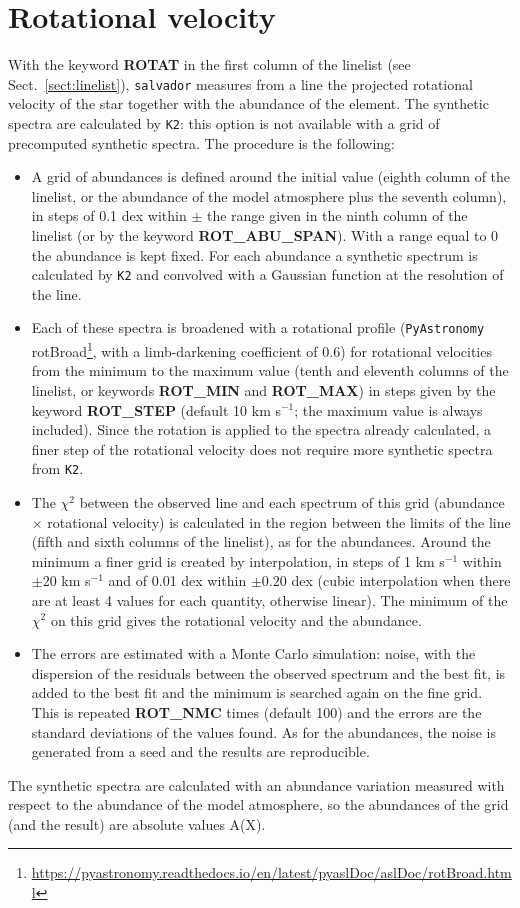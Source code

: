 \documentclass[modern]{aastex701}
\begin{document}
\section{Rotational velocity} \label{sect:rotation}
\hrulefill

With the keyword {\bf ROTAT} in the first column of the linelist (see Sect.~\ref{sect:linelist}), \texttt{salvador} measures from a line the projected rotational velocity of the star together with the abundance of the element. The synthetic spectra are calculated by \texttt{K2}: this option is not available with a grid of precomputed synthetic spectra. The procedure is the following:
\begin{itemize}
    \item A grid of abundances is defined around the initial value (eighth column of the linelist, or the abundance of the model atmosphere plus the seventh column), in steps of 0.1 dex within $\pm$ the range given in the ninth column of the linelist (or by the keyword {\bf ROT\_ABU\_SPAN}). With a range equal to 0 the abundance is kept fixed. For each abundance a synthetic spectrum is calculated by \texttt{K2} and convolved with a Gaussian function at the resolution of the line.
    \item Each of these spectra is broadened with a rotational profile (\texttt{PyAstronomy} rotBroad\footnote{\url{https://pyastronomy.readthedocs.io/en/latest/pyaslDoc/aslDoc/rotBroad.html}}, with a limb-darkening coefficient of 0.6) for rotational velocities from the minimum to the maximum value (tenth and eleventh columns of the linelist, or keywords {\bf ROT\_MIN} and {\bf ROT\_MAX}) in steps given by the keyword {\bf ROT\_STEP} (default 10 km s$^{-1}$; the maximum value is always included). Since the rotation is applied to the spectra already calculated, a finer step of the rotational velocity does not require more synthetic spectra from \texttt{K2}.
    \item The $\chi^2$ between the observed line and each spectrum of this grid (abundance $\times$ rotational velocity) is calculated in the region between the limits of the line (fifth and sixth columns of the linelist), as for the abundances. Around the minimum a finer grid is created by interpolation, in steps of 1 km s$^{-1}$ within $\pm 20$ km s$^{-1}$ and of 0.01 dex within $\pm 0.20$ dex (cubic interpolation when there are at least 4 values for each quantity, otherwise linear). The minimum of the $\chi^2$ on this grid gives the rotational velocity and the abundance.
    \item The errors are estimated with a Monte Carlo simulation: noise, with the dispersion of the residuals between the observed spectrum and the best fit, is added to the best fit and the minimum is searched again on the fine grid. This is repeated {\bf ROT\_NMC} times (default 100) and the errors are the standard deviations of the values found. As for the abundances, the noise is generated from a seed and the results are reproducible.
\end{itemize}
The synthetic spectra are calculated with an abundance variation measured with respect to the abundance of the model atmosphere, so the abundances of the grid (and the result) are absolute values A(X). 
\end{document}
